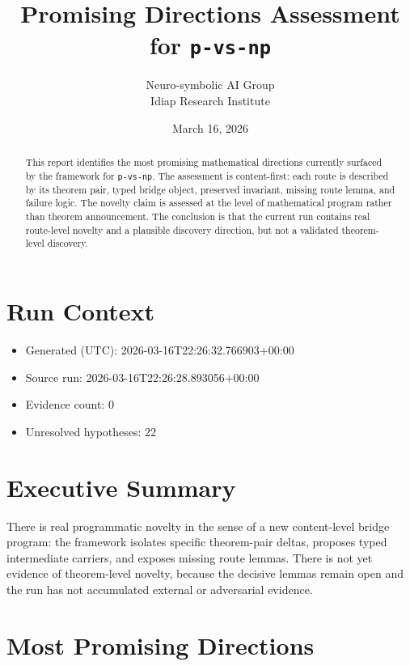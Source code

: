 \documentclass[11pt]{article}
\title{Promising Directions Assessment for \texttt{p-vs-np}}
\author{Neuro-symbolic AI Group\\Idiap Research Institute}
\date{March 16, 2026}
\begin{document}
\maketitle

\begin{abstract}
This report identifies the most promising mathematical directions currently surfaced by the framework for
\texttt{p-vs-np}. The assessment is content-first: each route is described by
its theorem pair, typed bridge object, preserved invariant, missing route lemma, and failure logic. The novelty claim
is assessed at the level of mathematical program rather than theorem announcement. The conclusion is that the current
run contains real route-level novelty and a plausible discovery direction, but not a validated theorem-level discovery.
\end{abstract}

\section{Run Context}
\begin{itemize}[leftmargin=*,itemsep=0.25em]
\item Generated (UTC): 2026-03-16T22:26:32.766903+00:00
\item Source run: 2026-03-16T22:26:28.893056+00:00
\item Evidence count: 0
\item Unresolved hypotheses: 22
\end{itemize}

\section{Executive Summary}
There is real programmatic novelty in the sense of a new content-level bridge program: the framework isolates specific theorem-pair deltas, proposes typed intermediate carriers, and exposes missing route lemmas. There is not yet evidence of theorem-level novelty, because the decisive lemmas remain open and the run has not accumulated external or adversarial evidence.

\section{Most Promising Directions}
\end{document}
